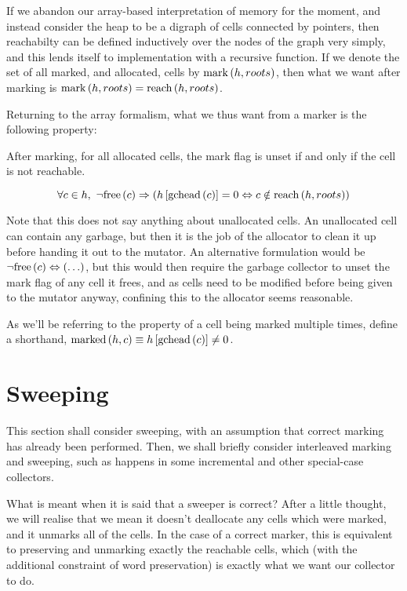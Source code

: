 If we abandon our array-based interpretation of memory for the moment,
and instead consider the heap to be a digraph of cells connected by
pointers, then reachabilty can be defined inductively over the nodes
of the graph very simply, and this lends itself to implementation with
a recursive function. If we denote the set of all marked, and
allocated, cells by $\mathrm{mark}\left(h, roots\right)$, then what we want after
marking is $\mathrm{mark}\left(h, roots\right) = \mathrm{reach}\left(h, roots\right)$.

Returning to the array formalism, what we thus want from a marker is
the following property:

\begin{definition}
  \label{def:ms-correct-marking}
  After marking, for all allocated cells, the mark flag is unset if
  and only if the cell is not reachable.

  \[\forall c \in h,\ \lnot\mathrm{free}\left(c\right) \Rightarrow
  \left(h\left[\mathrm{gchead}\left(c\right)\right] = 0 \Leftrightarrow c \notin
    \mathrm{reach}\left(h, roots\right)\right)\]
\end{definition}

Note that this does not say anything about unallocated cells. An
unallocated cell can contain any garbage, but then it is the job of
the allocator to clean it up before handing it out to the mutator. An
alternative formulation would be $\lnot\mathrm{free}\left(c\right) \Leftrightarrow
\left(\ldots\right)$, but this would then require the garbage
collector to unset the mark flag of any cell it frees, and as cells
need to be modified before being given to the mutator anyway,
confining this to the allocator seems reasonable.

As we'll be referring to the property of a cell being marked multiple
times, define a shorthand, $\mathrm{marked}\left(h, c\right) \equiv
h\left[\mathrm{gchead}\left(c\right)\right] \neq 0$.

\section{Sweeping}
\label{sec:marksweep-sweeping}

This section shall consider sweeping, with an assumption that correct
marking has already been performed. Then, we shall briefly consider
interleaved marking and sweeping, such as happens in some incremental
and other special-case collectors.

What is meant when it is said that a sweeper is correct? After a
little thought, we will realise that we mean it doesn't deallocate any
cells which were marked, and it unmarks all of the cells. In the case
of a correct marker, this is equivalent to preserving and unmarking
exactly the reachable cells, which (with the additional constraint of
word preservation) is exactly what we want our collector to do.

